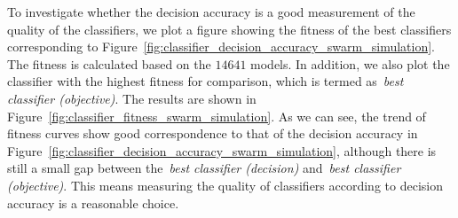 To investigate whether the decision accuracy is a good measurement of the quality of the classifiers, we plot a figure showing the fitness of the best classifiers corresponding to Figure~\ref{fig:classifier_decision_accuracy_swarm_simulation}. The fitness is calculated based on the $14641$ models. In addition, we also plot the classifier with the highest fitness for comparison, which is termed as~\textit{best classifier (objective)}. The results are shown in Figure~\ref{fig:classifier_fitness_swarm_simulation}. As we can see, the trend of fitness curves show good correspondence to that of the decision accuracy in Figure~\ref{fig:classifier_decision_accuracy_swarm_simulation}, although there is still a small gap between the~\textit{best classifier (decision)} and~\textit{best classifier (objective)}. This means measuring the quality of classifiers according to decision accuracy is a reasonable choice.

